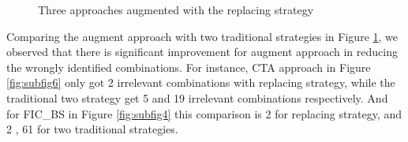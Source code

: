 \documentclass{sig-alternate}
\begin{document}
\begin{figure}[ht]
\centering
{}
\caption[Optional caption for list of figures]{Three approaches augmented with the replacing strategy}
\label{fig:subfigureExample2}
\end{figure}


Comparing the augment approach with two traditional strategies in Figure \ref{fig:subfigureExample2}, we observed that there is significant improvement for augment approach in reducing the wrongly identified combinations. For instance, CTA approach in Figure \ref{fig:subfig6} only got 2 irrelevant combinations with replacing strategy, while the traditional two strategy get 5 and 19 irrelevant combinations respectively. And for FIC\_BS in Figure \ref{fig:subfig4} this comparison is 2 for replacing strategy, and 2 , 61 for two traditional strategies.
\end{document}
